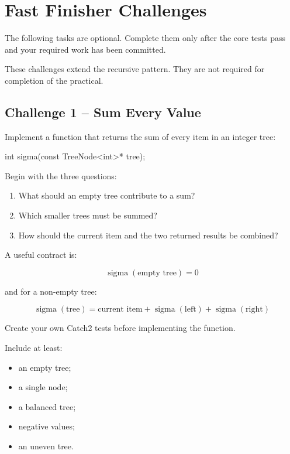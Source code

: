 \documentclass{csc2059practical}
\begin{document}
\section{Fast Finisher Challenges}

The following tasks are optional. Complete them only after the core tests pass
and your required work has been committed.

\begin{importantnote}
These challenges extend the recursive pattern. They are not required for
completion of the practical.
\end{importantnote}

\subsection{Challenge 1 -- Sum Every Value}

Implement a function that returns the sum of every item in an integer tree:

\begin{cppcode}
int sigma(const TreeNode<int>* tree);
\end{cppcode}

Begin with the three questions:

\begin{enumerate}
    \item What should an empty tree contribute to a sum?
    \item Which smaller trees must be summed?
    \item How should the current item and the two returned results be combined?
\end{enumerate}

A useful contract is:

\[
\operatorname{sigma}(\text{empty tree})=0
\]

and for a non-empty tree:

\[
\operatorname{sigma}(\text{tree})
=
\text{current item}
+
\operatorname{sigma}(\text{left})
+
\operatorname{sigma}(\text{right})
\]

Create your own Catch2 tests before implementing the function.

Include at least:

\begin{itemize}
    \item an empty tree;
    \item a single node;
    \item a balanced tree;
    \item negative values;
    \item an uneven tree.
\end{itemize}
\end{document}
